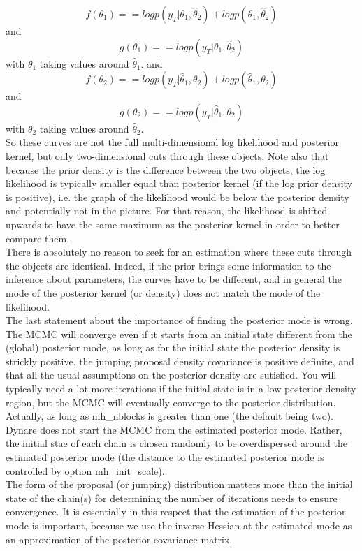 \documentclass[cn,10pt,math=newtx,citestyle=gb7714-2015,bibstyle=gb7714-2015]{elegantbook}
\begin{document}
{{\begin{enumerate}
{			$$f(\theta_1)==logp(y_T|\theta_1,\hat{\theta}_2)+logp(\theta_1,\hat{\theta}_2)$$
			and
			$$g(\theta_1)==logp(y_T|\theta_1,\hat{\theta}_2)$$
			with $\theta_1$ taking values around $\hat{\theta}_1$. and
			$$f(\theta_2)==logp(y_T|\hat{\theta}_1,\theta_2)+logp(\hat{\theta}_1,\theta_2)$$
			and
			$$g(\theta_2)==logp(y_T|\hat{\theta}_1,\theta_2)$$
			with $\theta_2$ taking values around $\hat{\theta}_2$. \\
			So these curves are not the full multi-dimensional log likelihood and posterior kernel, but only two-dimensional cuts through these objects. Note also that because the prior density is the difference between the two objects, the log likelihood is typically smaller equal than posterior kernel (if the log prior density is positive), i.e. the graph of the likelihood would be below the posterior density and potentially not in the picture. For that reason, the likelihood is shifted upwards to have the same maximum as the posterior kernel in order to better compare them.\\
			There is absolutely no reason to seek for an estimation where these cuts through the objects are identical. Indeed, if the prior brings some information to the inference about parameters, the curves have to be different, and in general the mode of the posterior kernel (or density) does not match the mode of the likelihood.\\
			The last statement about the importance of finding the posterior mode is wrong. The MCMC will converge even if it starts from an initial state different from the (global) posterior mode, as long as for the initial state the posterior density is strickly positive, the jumping proposal density covariance is positive definite, and that all the usual assumptions on the posterior density are sutisfied. You will typically need a lot more iterations if the initial state is in a low posterior density region, but the MCMC will eventually converge to the posterior distribution. Actually, as long as mh\_nblocks is greater than one (the default being two). Dynare does not start the MCMC from the estimated posterior mode. Rather, the initial stae of each chain is chosen randomly to be overdispersed around the estimated posterior mode (the distance to the estimated posterior mode is controlled by option mh\_init\_scale).\\
			The form of the proposal (or jumping) distribution matters more than the initial state of the chain(s) for determining the number of iterations needs to ensure convergence. It is essentially in this respect that the estimation of the posterior mode is important, because we use the inverse Hessian at the estimated mode as an approximation of the posterior covariance matrix.}

\end{enumerate}}}
\end{document}
